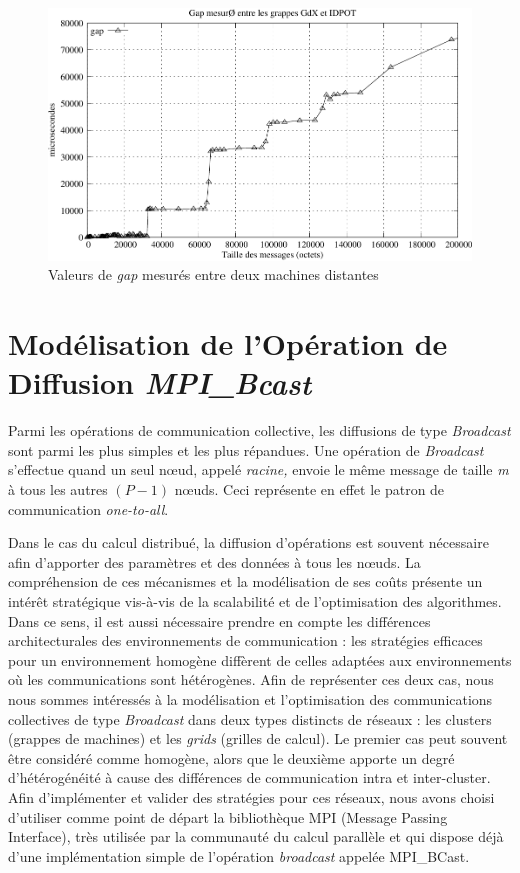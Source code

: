 %
\begin{figure}
\centering
\includegraphics[width=0.7\linewidth]{images/p2p/hockney-logp1}

\caption{\label{Figure: logp x hockney}Valeurs de \textit{gap} mesurés entre deux machines
distantes \cite{Steffenel05c}}

\end{figure}



\section{Modélisation de l'Opération de Diffusion \textit{MPI\_Bcast}}

Parmi les opérations de communication collective, les diffusions de type \textit{Broadcast} sont parmi les plus simples et les plus répandues. Une opération de \emph{Broadcast} s'effectue quand un seul n{\oe}ud,
appelé \emph{racine,} envoie le même message de taille \emph{m} à
tous les autres $(P-1)$ n{\oe}uds.  Ceci représente en effet le patron de communication \textit{one-to-all}. 

Dans le cas du calcul distribué, la diffusion d'opérations est souvent nécessaire afin d'apporter des paramètres et des données à tous les n{\oe}uds.  La compréhension de ces mécanismes et la modélisation de ses coûts présente un intérêt stratégique vis-à-vis de la scalabilité et de l'optimisation des algorithmes. Dans ce sens, il est aussi nécessaire prendre en compte les différences architecturales des environnements de communication : les stratégies efficaces pour un environnement homogène diffèrent de celles adaptées aux environnements où les communications sont hétérogènes. Afin de représenter ces deux cas, nous nous sommes intéressés à la modélisation et l'optimisation des communications collectives de type \textit{Broadcast} dans deux types distincts de réseaux : les clusters (grappes de machines) et les \textit{grids} (grilles de calcul). Le premier cas  peut souvent être considéré comme homogène, alors que le deuxième apporte un degré d'hétérogénéité à cause des différences de communication intra et inter-cluster. Afin d'implémenter et valider des stratégies pour ces réseaux, nous avons choisi d'utiliser comme point de départ la bibliothèque MPI (Message Passing Interface), très utilisée par la communauté du calcul parallèle et qui dispose déjà d'une implémentation simple de l'opération \textit{broadcast} appelée MPI\_BCast.   

